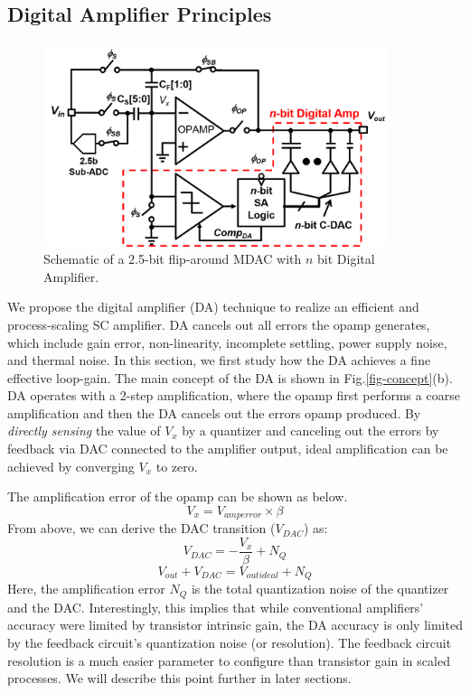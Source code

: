  
\subsection{Digital Amplifier Principles}
\begin{figure}
\centering
  \includegraphics[width=0.9\textwidth]{figure/chap2/da-top.png}
  \caption{Schematic of a 2.5-bit flip-around MDAC with $n$ bit Digital Amplifier. }
  \label{fig-da-top}
\end{figure}

We propose the digital amplifier (DA) technique to realize an efficient and process-scaling SC amplifier.
DA cancels out all errors the opamp generates, which include gain error, non-linearity, incomplete settling, power supply noise, and thermal noise. In this section, we first study how the DA achieves a fine effective loop-gain. The main concept of the DA is shown in Fig.\ref{fig-concept}(b). DA operates with a 2-step amplification, where the opamp first performs a coarse amplification and then the DA cancels out the errors opamp produced. 
By \textit{directly sensing} the value of $V_x$ by a quantizer and canceling out the errors by feedback via DAC connected to the amplifier output, ideal amplification can be achieved by converging $V_x$ to zero. 

The amplification error of the opamp can be shown as below.
\begin{equation}
V_{x} = V_{amperror} \times \beta
\end{equation}
From above, we can derive the DAC transition ($V_{DAC}$) as:   
\begin{equation}
V_{DAC} = - \frac{V_{x}}{\beta} + N_{Q}
\end{equation}
\begin{equation}
V_{out} + V_{DAC} = V_{outideal} + N_{Q}
\end{equation}
Here, the amplification error $N_{Q}$ is the total quantization noise of the quantizer and the DAC. Interestingly, this implies that while conventional amplifiers' accuracy were limited by transistor intrinsic gain, the DA accuracy is only limited by the feedback circuit's quantization noise (or resolution). The feedback circuit resolution is a much easier parameter to configure than transistor gain in scaled processes. We will describe this point further in later sections. 


